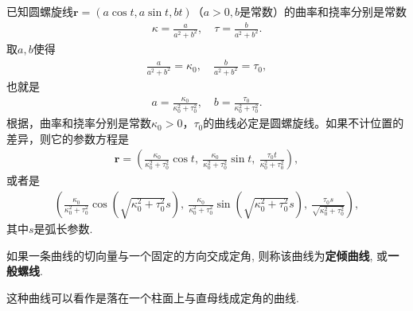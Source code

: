 \documentclass[../../main.tex]{subfiles}%
\begin{document}
\begin{solution}

已知圆螺旋线$\bm{r} = (a\cos t,a\sin t,bt)$（$a>0,b$是常数）的曲率和挠率分别是常数
\begin{align*}
\kappa = \frac{a}{a^2 + b^2},\quad \tau = \frac{b}{a^2 + b^2}.
\end{align*}
取$a,b$使得
\begin{align*}
\frac{a}{a^2 + b^2} = \kappa_0,\quad \frac{b}{a^2 + b^2} = \tau_0,
\end{align*}
也就是
\begin{align*}
a = \frac{\kappa_0}{\kappa_0^2 + \tau_0^2},\quad b = \frac{\tau_0}{\kappa_0^2 + \tau_0^2}.
\end{align*}
根据，曲率和挠率分别是常数$\kappa_0 > 0$，$\tau_0$的曲线必定是圆螺旋线。如果不计位置的差异，则它的参数方程是
\begin{align*}
\bm{r} = \left( \frac{\kappa_0}{\kappa_0^2 + \tau_0^2}\cos t,\ \frac{\kappa_0}{\kappa_0^2 + \tau_0^2}\sin t,\ \frac{\tau_0 t}{\kappa_0^2 + \tau_0^2} \right),
\end{align*}
或者是
\begin{align*}
\left( \frac{\kappa_0}{\kappa_0^2 + \tau_0^2}\cos\left( \sqrt{\kappa_0^2 + \tau_0^2}s \right),\ \frac{\kappa_0}{\kappa_0^2 + \tau_0^2}\sin\left( \sqrt{\kappa_0^2 + \tau_0^2}s \right),\ \frac{\tau_0 s}{\sqrt{\kappa_0^2 + \tau_0^2}} \right),
\end{align*}
其中$s$是弧长参数.

\end{solution}

\begin{definition}[定倾曲线]
如果一条曲线的切向量与一个固定的方向交成定角, 则称该曲线为\textbf{定倾曲线}, 或\textbf{一般螺线}. 
\end{definition}
\begin{remark}
这种曲线可以看作是落在一个柱面上与直母线成定角的曲线. 
\end{remark}
\end{document}
